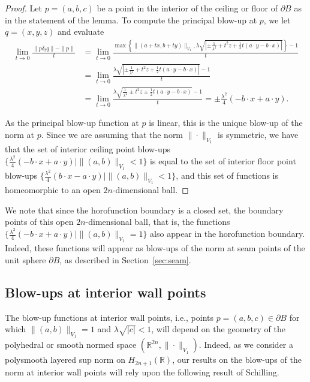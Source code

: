 \documentclass{article}
\theoremstyle{definition}
\newcommand{\norm}[1]{\|#1\|}
\newcommand{\HHR}{H_{2n+1}(\mathbb{R})}
\newcommand{\R}{{\mathbb R}}
\begin{document}
\begin{proof}
Let $p = (a,b,c)$ be a point in the interior of the ceiling or floor of $\partial B$ as in the statement of the lemma. To compute the principal blow-up at $p$, we let $q = (x,y,z)$ and evaluate
\begin{align*}
\lim_{t\to0} \frac{\norm{p\delta_tq} - \norm{p}}{t} & = \lim_{t\to0}\frac{\max\left\{\norm{(a + tx, b + ty)}_{V_1}, \lambda\sqrt{|\pm \frac{1}{\lambda^2} + t^2z + \frac12 t(a\cdot y - b\cdot x)|}\right\} - 1}{t}\\
& = \lim_{t\to0}\frac{\lambda\sqrt{|\pm \frac{1}{\lambda^2} + t^2z + \frac12 t(a\cdot y - b\cdot x)|}- 1}{t}\\
& = \lim_{t\to0}\frac{\lambda\sqrt{\frac{1}{\lambda^2} \pm t^2z \pm \frac12 t(a\cdot y - b\cdot x)}- 1}{t}  = \pm \frac{\lambda^2}{4}(-b\cdot x + a\cdot y).
\end{align*}

As the principal blow-up function at $p$ is linear, this is the unique blow-up of the norm at $p$.
Since we are assuming that the norm $\norm{\cdot}_{V_1}$ is symmetric, we have that the set of interior ceiling point blow-ups $\{\frac{\lambda^2}{4}(-b\cdot x + a\cdot y)\mid \norm{(a,b)}_{V_1} < 1\}$ is equal to the set of interior floor point blow-ups $\{\frac{\lambda^2}{4}(b\cdot x - a\cdot y)\mid \norm{(a,b)}_{V_1} < 1\}$, and this set of functions is homeomorphic to an open $2n$-dimensional ball.
\end{proof}

We note that since the horofunction boundary is a closed set, the boundary points of this open $2n$-dimensional ball, that is, the functions $\{\frac{\lambda^2}4(-b\cdot x + a\cdot y)\mid \norm{(a,b)}_{V_1} =1\}$
also appear in the horofunction boundary. Indeed, these functions will appear as blow-ups of the norm at seam points of the unit sphere $\partial B$, as described in Section~\ref{sec:seam}.

\subsection{Blow-ups at interior wall points}

The blow-up functions at interior wall points, i.e., points $p=(a,b,c) \in \partial B$ for which $\norm{(a,b)}_{V_1} =1$ and $\lambda\sqrt{|c|} < 1$, will depend on the geometry of the polyhedral or smooth normed space $(\R^{2n}, \norm{\cdot}_{V_1})$. Indeed, as we consider a polysmooth layered sup norm on $\HHR$, our results on the blow-ups of the norm at interior wall points will rely upon the following result of Schilling.
\end{document}

